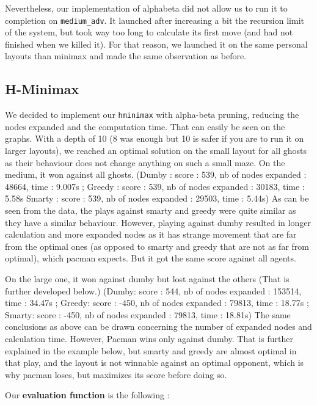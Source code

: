\documentclass[a4paper, 11pt]{article}
\begin{document}
	Nevertheless, our implementation of alphabeta did not allow us to run it to completion on \texttt{medium\_adv}. It launched after increasing a bit the recursion limit of the system, but took way too long to calculate its first move (and had not finished when we killed it). For that reason, we launched it on the same personal layouts than minimax and made the same observation as before.
	
	\subsection{H-Minimax}
	
	We decided to implement our \texttt{hminimax} with alpha-beta pruning, reducing the nodes expanded and the computation time. That can easily be seen on the graphs. With a depth of 10 (8 was enough but 10 is safer if you are to run it on larger layouts), we reached an optimal solution on the small layout for all ghosts as their behaviour does not change anything on such a small maze. On the medium, it won against all ghosts. (Dumby : score : 539, nb of nodes expanded : 48664, time : 9.007s ;
Greedy : score : 539, nb of nodes expanded : 30183, time : 5.58s
Smarty : score : 539, nb of nodes expanded : 29503, time : 5.44s)\newline
As can be seen from the data, the plays against smarty and greedy were quite similar as they have a similar behaviour. However, playing against dumby resulted in longer calculation and more expanded nodes as it has strange movement that are far from the optimal ones (as opposed to smarty and greedy that are not as far from optimal), which pacman expects. But it got the same score against all agents.
	
	On the large one, it won against dumby but lost against the others (That is further developed below.) (Dumby: score : 544, nb of nodes expanded : 153514, time : 34.47s ; 
Greedy: score : -450, nb of nodes expanded : 79813, time : 18.77s ; 
Smarty: score : -450, nb of nodes expanded : 79813, time : 18.81s)\newline
The same conclusions as above can be drawn concerning the number of expanded nodes and calculation time. However, Pacman wins only against dumby. That is further explained in the example below, but smarty and greedy are almost optimal in that play, and the layout is not winnable against an optimal opponent, which is why pacman loses, but maximizes its score before doing so.
	
	Our \textbf{evaluation function} is the following : 
	
\end{document}
